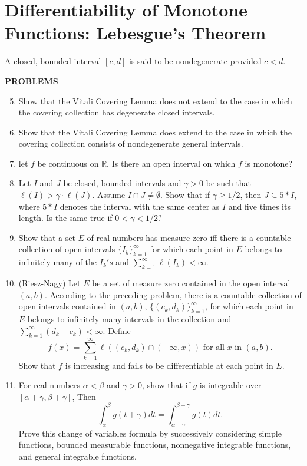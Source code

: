 \section{Differentiability of Monotone Functions: Lebesgue's Theorem}
A closed, bounded interval $[c,d]$ is said to be nondegenerate provided $c<d$.
\begin{center}
	\textbf{PROBLEMS}
\end{center}
\begin{enumerate}
	\setcounter{enumi}{4}
    \item Show that the Vitali Covering Lemma does not extend to the case in which the covering collection has degenerate closed intervals.
    \item Show that the Vitali Covering Lemma does extend to the case in which the covering collection consists of nondegenerate general intervals.
    \item let $f$ be continuous on $\mathbb{R}$. Is there an open interval on which $f$ is monotone?
    \item Let $I$ and $J$ be closed, bounded intervals and $\gamma>0$ be such that $\ell(I)>\gamma\cdot\ell(J)$.
    Assume $I\cap J\neq\emptyset$. Show that if $\gamma\ge 1/2$, then $J\subseteq 5*I$, where $5*I$ denotes the interval with the same center as $I$ and five times its length.
    Is the same true if $0<\gamma<1/2$?
    \item Show that a set $E$ of real numbers has measure zero iff there is a countable collection of open intervals $\{I_k\}_{k=1}^\infty$ for which each point in $E$ belongs to infinitely many of the $I_k's$ and $\sum_{k=1}^\infty\ell(I_k)<\infty$.
    \item (Riesz-Nagy) Let $E$ be a set of measure zero contained in the open interval $(a,b)$.
    According to the preceding problem, there is a countable collection of open intervals contained in $(a,b)$, $\{(c_k,d_k)\}_{k=1}^\infty$, for which each point in $E$ belongs to infinitely many intervals in the collection and $\sum_{k=1}^\infty(d_k-c_k)<\infty$.
    Define
    \[
        f(x)=\sum_{k=1}^\infty\ell((c_k,d_k)\cap(-\infty,x))\text{ for all }x\text{ in }(a,b).
    \]
    Show that $f$ is increasing and fails to be differentiable at each point in $E$.
    \item For real numbers $\alpha<\beta$ and $\gamma>0$, show that if $g$ is integrable over $[\alpha+\gamma,\beta+\gamma]$, Then
    \[
        \int_{\alpha}^{\beta}g(t+\gamma)dt=\int_{\alpha+\gamma}^{\beta+\gamma}g(t)dt.  
    \]
    Prove this change of variables formula by successively considering simple functions, bounded measurable functions, nonnegative integrable functions, and general integrable functions.

\end{enumerate}
